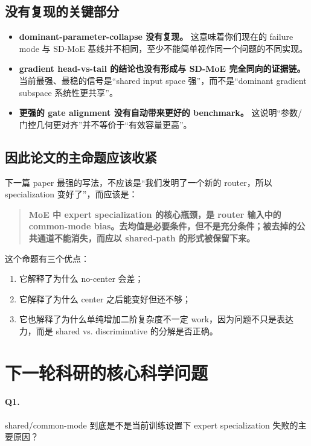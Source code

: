 \documentclass[11pt]{article}
\begin{document}
\subsection{没有复现的关键部分}
\begin{itemize}
    \item \textbf{dominant-parameter-collapse 没有复现。} 这意味着你们现在的 failure mode 与 SD-MoE 基线并不相同，至少不能简单视作同一个问题的不同实现。
    \item \textbf{gradient head-vs-tail 的结论也没有形成与 SD-MoE 完全同向的证据链。} 当前最强、最稳的信号是“shared input space 强”，而不是“dominant gradient subspace 系统性更共享”。
    \item \textbf{更强的 gate alignment 没有自动带来更好的 benchmark。} 这说明“参数/门控几何更对齐”并不等价于“有效容量更高”。
\end{itemize}

\subsection{因此论文的主命题应该收紧}
下一篇 paper 最强的写法，不应该是“我们发明了一个新的 router，所以 specialization 变好了”，而应该是：
\begin{quote}
\textbf{MoE 中 expert specialization 的核心瓶颈，是 router 输入中的 common-mode bias。去均值是必要条件，但不是充分条件；被去掉的公共通道不能消失，而应以 shared-path 的形式被保留下来。}
\end{quote}

这个命题有三个优点：
\begin{enumerate}
    \item 它解释了为什么 no-center 会差；
    \item 它解释了为什么 center 之后能变好但还不够；
    \item 它也解释了为什么单纯增加二阶复杂度不一定 work，因为问题不只是表达力，而是 shared vs. discriminative 的分解是否正确。
\end{enumerate}

\section{下一轮科研的核心科学问题}

\paragraph{Q1.} shared/common-mode 到底是不是当前训练设置下 expert specialization 失败的主要原因？
\end{document}
